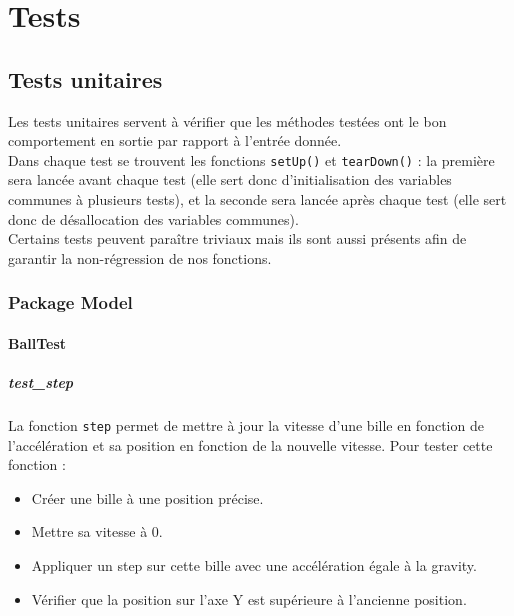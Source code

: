 \documentclass{report}
\begin{document}
\chapter{Tests}

\section{Tests unitaires}

Les tests unitaires servent à vérifier que les méthodes testées ont le bon comportement en sortie par rapport à l’entrée donnée. \\

Dans chaque test se trouvent les fonctions \texttt{setUp()} et \texttt{tearDown()} : la première sera lancée avant chaque test (elle sert donc d’initialisation des variables communes à plusieurs tests), et la seconde sera lancée après chaque test (elle sert donc de désallocation des variables communes). \\

Certains tests peuvent paraître triviaux mais ils sont aussi présents afin de garantir la non-régression de nos fonctions.

\subsection{Package Model}

\subsubsection{BallTest}

\paragraph{test\_step}

La fonction \texttt{step} permet de mettre à jour la vitesse d’une bille en fonction de l’accélération et sa position en fonction de la nouvelle vitesse. Pour tester cette fonction : 
\begin{itemize}
\item Créer une bille à une position précise.
\item Mettre sa vitesse à 0.
\item Appliquer un step sur cette bille avec une accélération égale à la gravity.
\item Vérifier que la position sur l’axe Y est supérieure à  l'ancienne position.
\end{itemize}
\end{document}
